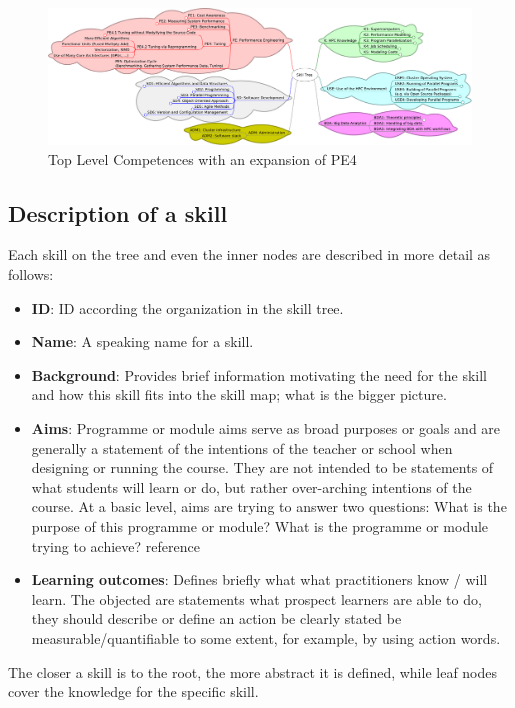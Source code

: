 \documentclass[jocse]{jocseart}
\newcommand{\jk}[1]{\todo[inline]{TODO: #1}}
\begin{document}
\begin{figure}[tb!]
	\centering
	\includegraphics[width=15.0cm]{skill-tree}
	\caption{Top Level Competences with an expansion of PE4}
	\label{f_top_level_competences}
\end{figure}

\subsection{Description of a skill}

Each skill on the tree and even the inner nodes are described in more detail as follows:

\begin{itemize}
  \item \textbf{ID}: ID according the organization in the skill tree.
  \item \textbf{Name}: A speaking name for a skill.
  \item \textbf{Background}: Provides brief information motivating the need for the skill and how this skill fits into the skill map; what is the bigger picture.
  \item \textbf{Aims}:
  \jk{TODO}
  Programme or module aims serve as broad purposes or goals and are generally a statement of the intentions of the teacher or school when designing or running the course. They are not intended to be statements of what students will learn or do, but rather over-arching intentions of the course. At a basic level, aims are trying to answer two questions: What is the purpose of this programme or module? What is the programme or module trying to achieve? reference
  \item \textbf{Learning outcomes}: Defines briefly what what practitioners know / will learn. The objected are statements what prospect learners are able to do, they should
  describe or define an action be clearly stated be measurable/quantifiable to some extent, for example, by using action words.
\end{itemize}

The closer a skill is to the root, the more abstract it is defined, while leaf nodes cover the knowledge for the specific skill.
\end{document}
